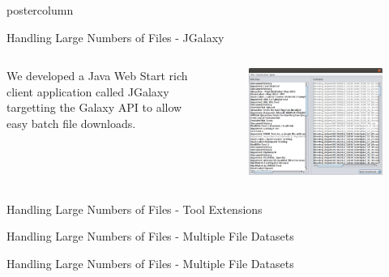 \documentclass[final]{beamer}
\begin{document}
\begin{frame}
\begin{columns}
\begin{column}{.33\textwidth}
\begin{beamercolorbox}[center,wd=\textwidth]{postercolumn}
\begin{minipage}[T]{.95\textwidth}
{\begin{block}{Handling Large Numbers of Files - JGalaxy}
            
            \begin{columns}
              \begin{column}{.55\textwidth}
              We developed a Java Web Start rich client application called
              JGalaxy targetting the Galaxy API to allow easy batch file
              downloads.  
              \end{column}              
              \begin{column}{.44\textwidth}
                \begin{figure}
                  \includegraphics[scale=0.5]{bulkdownload_jgalaxy.png}
                \end{figure}              
              \end{column}
            \end{columns}
            
            \end{block}
            \vfill
            \begin{block}{Handling Large Numbers of Files - Tool Extensions}

            \end{block}
            \vfill
            \begin{block}{Handling Large Numbers of Files - Multiple File Datasets}

            \end{block}
            \vfill
            \begin{block}{Handling Large Numbers of Files - Multiple File Datasets}


\end{block}}
\end{minipage}
\end{beamercolorbox}
\end{column}
\end{columns}
\end{frame}
\end{document}

